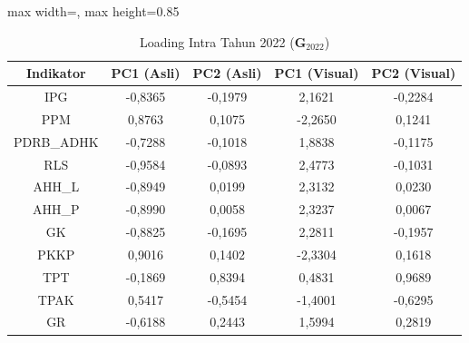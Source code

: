 \begin{table}[H]
\centering
\caption{Loading Intra Tahun 2022 ($\mathbf{G}_{2022}$)} \label{tab:app2loading_intra_2022}
\begin{adjustbox}{max width=\textwidth, max height=0.85\textheight}
\begin{tabular}{|c|c|c|c|c|}
\hline
\textbf{Indikator} & \textbf{PC1 (Asli)} & \textbf{PC2 (Asli)} & \textbf{PC1 (Visual)} & \textbf{PC2 (Visual)} \\
\hline
IPG & -0,8365 & -0,1979 & 2,1621 & -0,2284 \\
PPM & 0,8763 & 0,1075 & -2,2650 & 0,1241 \\
PDRB\_ADHK & -0,7288 & -0,1018 & 1,8838 & -0,1175 \\
RLS & -0,9584 & -0,0893 & 2,4773 & -0,1031 \\
AHH\_L & -0,8949 & 0,0199 & 2,3132 & 0,0230 \\
AHH\_P & -0,8990 & 0,0058 & 2,3237 & 0,0067 \\
GK & -0,8825 & -0,1695 & 2,2811 & -0,1957 \\
PKKP & 0,9016 & 0,1402 & -2,3304 & 0,1618 \\
TPT & -0,1869 & 0,8394 & 0,4831 & 0,9689 \\
TPAK & 0,5417 & -0,5454 & -1,4001 & -0,6295 \\
GR & -0,6188 & 0,2443 & 1,5994 & 0,2819 \\
\hline
\end{tabular}
\end{adjustbox}
\end{table}